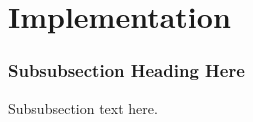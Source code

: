 \documentclass[conference]{IEEEtran}
\begin{document}
\section{Implementation}
\label{sec:implementation}



\subsubsection{Subsubsection Heading Here}
Subsubsection text here.




%
%



%
%
\end{document}
